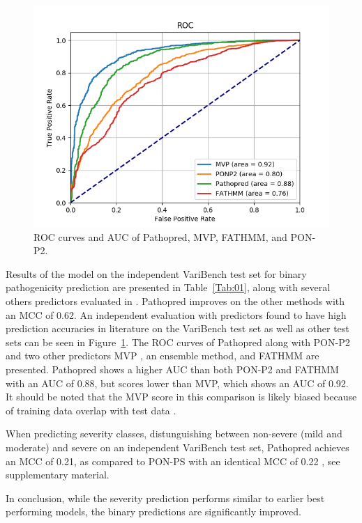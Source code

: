 \documentclass{bioinfo}
\begin{document}
\begin{figure}[!tpb]
\centerline{\includegraphics[scale=0.5]{varibench_tolerance_test_ROC.png}}
\caption{ROC curves and AUC of Pathopred, MVP, FATHMM, and PON-P2.}\label{fig:01}
\end{figure}

Results of the model on the independent VariBench test set for binary
pathogenicity prediction are presented in Table~\ref{Tab:01}, along
with several others predictors evaluated in
\citep{Niroula2015}. Pathopred improves on the other methods with an
MCC of 0.62. An independent evaluation with predictors found to have
high prediction accuracies in literature on the VariBench test set as
well as other test sets can be seen in Figure~\ref{fig:01}. The ROC
curves of Pathopred along with PON-P2 and two other predictors MVP
\citep{Qi2018}, an ensemble method, and FATHMM \citep{Shihab2013} are
presented. Pathopred shows a higher AUC than both PON-P2 and FATHMM
with an AUC of 0.88, but scores lower than MVP, which shows an AUC of
0.92. It should be noted that the MVP score in this comparison is
likely biased because of training data overlap with test data
\citep{Kvist2018}.

When predicting severity classes, distunguishing between non-severe
(mild and moderate) and severe on an independent VariBench test set,
Pathopred achieves an MCC of 0.21, as compared to PON-PS with an
identical MCC of 0.22 \citep{Niroula2017}, see supplementary
material.


In conclusion, while the severity prediction performs
similar to earlier best performing models, the binary predictions are
significantly improved.
\end{document}
